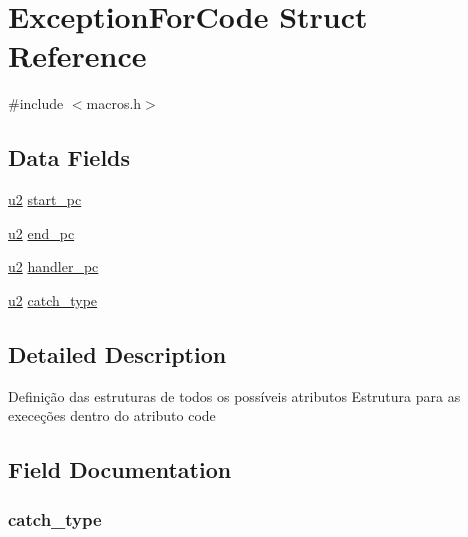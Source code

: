 \hypertarget{struct_exception_for_code}{}\section{Exception\+For\+Code Struct Reference}
\label{struct_exception_for_code}


{\ttfamily \#include $<$macros.\+h$>$}

\subsection*{Data Fields}
\begin{DoxyCompactItemize}
\item 
\hyperlink{macros_8h_a732cde1300aafb73b0ea6c2558a7a54f}{u2} \hyperlink{struct_exception_for_code_a3ded0b47a89e0816c20dc577a82a1cd5}{start\+\_\+pc}
\item 
\hyperlink{macros_8h_a732cde1300aafb73b0ea6c2558a7a54f}{u2} \hyperlink{struct_exception_for_code_a9c136439106544c4d1c986316d6d5fa2}{end\+\_\+pc}
\item 
\hyperlink{macros_8h_a732cde1300aafb73b0ea6c2558a7a54f}{u2} \hyperlink{struct_exception_for_code_a69a19b4db26dd1a8341f02051cb221a7}{handler\+\_\+pc}
\item 
\hyperlink{macros_8h_a732cde1300aafb73b0ea6c2558a7a54f}{u2} \hyperlink{struct_exception_for_code_a0f7b3379ca0a3516e71359436ae5abf1}{catch\+\_\+type}
\end{DoxyCompactItemize}


\subsection{Detailed Description}
Definição das estruturas de todos os possíveis atributos Estrutura para as execeções dentro do atributo code 

\subsection{Field Documentation}
\hypertarget{struct_exception_for_code_a0f7b3379ca0a3516e71359436ae5abf1}{}
\subsubsection[{catch\+\_\+type}]{ catch\+\_\+type}\label{struct_exception_for_code_a0f7b3379ca0a3516e71359436ae5abf1}
\hypertarget{struct_exception_for_code_a9c136439106544c4d1c986316d6d5fa2}{}
